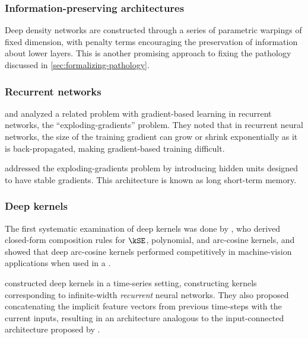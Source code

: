 %
%
%

\subsubsection{Information-preserving architectures}
Deep density networks \citep{rippel2013high} are constructed through a series of parametric warpings of fixed dimension, with penalty terms encouraging the preservation of information about lower layers.
This is another promising approach to fixing the pathology discussed in \cref{sec:formalizing-pathology}.

\subsubsection{Recurrent networks}
\citet{bengio1994learning} and \citet{pascanu2012understanding} analyzed a related problem with gradient-based learning in recurrent networks, the ``exploding-gradients'' problem.
They noted that in recurrent neural networks, the size of the training gradient can grow or shrink exponentially as it is back-propagated, making gradient-based training difficult.

\citet{hochreiter1997long} addressed the exploding-gradients problem by introducing hidden units designed to have stable gradients.
This architecture is known as long short-term memory.

\subsubsection{Deep kernels}

The first systematic examination of deep kernels was done by \citet{cho2009kernel}, who derived closed-form composition rules for $\kSE$, polynomial, and arc-cosine kernels, and showed that deep arc-cosine kernels performed competitively in machine-vision applications when used in a \SVM{}.

\citet{hermans2012recurrent} constructed deep kernels in a time-series setting, constructing kernels corresponding to infinite-width \emph{recurrent} neural networks.
They also proposed concatenating the implicit feature vectors from previous time-steps with the current inputs, resulting in an architecture analogous to the input-connected architecture proposed by \citet[chapter 2]{neal1995bayesian}.

